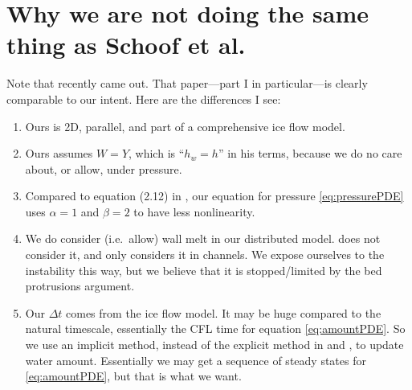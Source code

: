 \documentclass[11pt]{amsart}
\begin{document}
\section{Why we are not doing the same thing as Schoof et al.}  Note that \cite{Schoofetal2012} recently came out.  That paper---part I in particular---is clearly comparable to our intent.  Here are the differences I see:
\begin{enumerate}
\item Ours is 2D, parallel, and part of a comprehensive ice flow model.
\item Ours assumes $W=Y$, which is ``$h_w=h$'' in his terms, because we do no care about, or allow, under pressure.
\item Compared to equation (2.12) in \cite{Schoofetal2012}, our equation for pressure \eqref{eq:pressurePDE} uses $\alpha = 1$ and $\beta=2$ to have less nonlinearity.
\item We do consider (i.e.~allow) wall melt in our distributed model.  \cite{Schoofetal2012} does not consider it, and \cite{Hewittetal2012} only considers it in channels.  We expose ourselves to the \cite{Walder1982} instability this way, but we believe that it is stopped/limited by the \cite{CreytsSchoof2009} bed protrusions argument.
\item Our $\Delta t$ comes from the ice flow model.  It may be huge compared to the natural timescale, essentially the CFL time for equation \eqref{eq:amountPDE}.  So we use an implicit method, instead of the explicit method in \cite{Schoofetal2012} and \cite{Hewittetal2012}, to update water amount.  Essentially we may get a sequence of steady states for \eqref{eq:amountPDE}, but that is what we want.
\end{enumerate}
\end{document}
